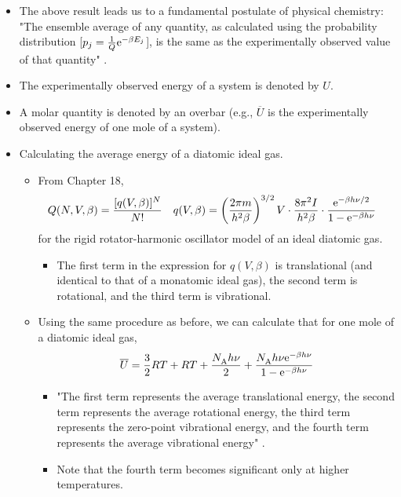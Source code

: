 \documentclass[../notes.tex]{subfiles}
\begin{document}
\begin{itemize}
    \item The above result leads us to a fundamental postulate of physical chemistry: "The ensemble average of any quantity, as calculated using the probability distribution [$p_j=\frac{1}{Q}\e[-\beta E_j]$], is the same as the experimentally observed value of that quantity" \parencite[700]{bib:McQuarrieSimon}.
    \item The experimentally observed energy of a system is denoted by $U$.
    \item A molar quantity is denoted by an overbar (e.g., $\overline{U}$ is the experimentally observed energy of one mole of a system).
    \item Calculating the average energy of a diatomic ideal gas.
    \begin{itemize}
        \item From Chapter 18,
        \begin{align*}
            Q(N,V,\beta) &= \frac{[q(V,\beta)]^N}{N!}&
            q(V,\beta) &= \left( \frac{2\pi m}{h^2\beta} \right)^{3/2}V\cdot\frac{8\pi^2I}{h^2\beta}\cdot\frac{\e[-\beta h\nu/2]}{1-\e[-\beta h\nu]}
        \end{align*}
        for the rigid rotator-harmonic oscillator model of an ideal diatomic gas.
        \begin{itemize}
            \item The first term in the expression for $q(V,\beta)$ is translational (and identical to that of a monatomic ideal gas), the second term is rotational, and the third term is vibrational.
        \end{itemize}
        \item Using the same procedure as before, we can calculate that for one mole of a diatomic ideal gas,
        \begin{equation*}
            \overline{U} = \frac{3}{2}RT+RT+\frac{\NA h\nu}{2}+\frac{\NA h\nu\e[-\beta h\nu]}{1-\e[-\beta h\nu]}
        \end{equation*}
        \begin{itemize}
            \item "The first term represents the average translational energy, the second term represents the average rotational energy, the third term represents the zero-point vibrational energy, and the fourth term represents the average vibrational energy" \parencite[701]{bib:McQuarrieSimon}.
            \item Note that the fourth term becomes significant only at higher temperatures. 
        \end{itemize}

\end{itemize}
\end{itemize}
\end{document}
